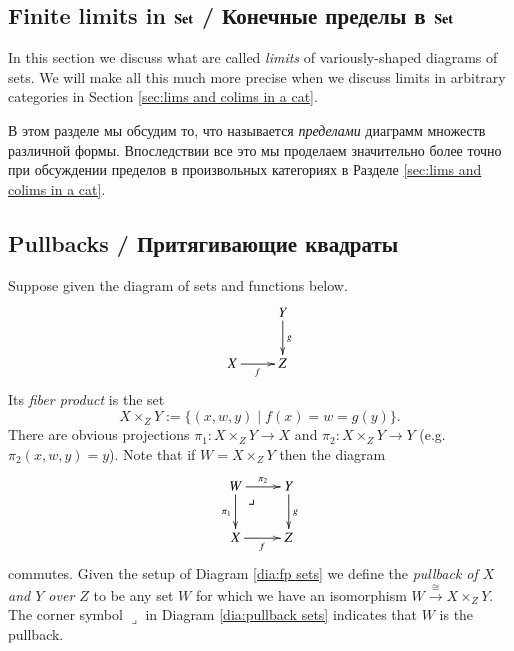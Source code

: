 \documentclass[a4paper]{book}
\makeatletter
\def\to{\rightarrow}
\def\taking{\colon}
\def\iso{\cong}
\def\|{{\;|\;}}
\def\ullimit{\ar@{}[rd]|(.3)*+{\lrcorner}}
\newcommand{\To}[1]{\xrightarrow{#1}}
\def\Set{{\bf Set}}
\theoremstyle{myth}
\newtheorem{definitionENG}[envENG]{\begin{english}Definition\end{english}}
\makeatother
\begin{document}
\begin{english}

\section{Finite limits in $\Set$ / Конечные пределы в $\Set$}\label{sec:finite limits}

In this section we discuss what are called {\em limits} of variously-shaped diagrams of sets. We will make all this much more precise when we discuss limits in arbitrary categories in Section \ref{sec:lims and colims in a cat}.

\begin{russian}В этом разделе мы обсудим то, что называется {\em пределами} диаграмм множеств различной формы. Впоследствии все это мы проделаем значительно более точно при обсуждении пределов в произвольных категориях в Разделе \ref{sec:lims and colims in a cat}. \end{russian}


\subsection{Pullbacks / Притягивающие квадраты}

\begin{definitionENG}[Pullback]\label{def:pullback}
Suppose given the diagram of sets and functions below.
\begin{align}\label{dia:fp sets}
\xymatrix{&Y\ar[d]^g\\
X\ar[r]_f&Z}
\end{align}
Its {\em fiber product} is the set 
$$X\times_ZY:=\{(x,w,y)\|f(x)=w=g(y)\}.$$ There are obvious projections $\pi_1\taking X\times_ZY\to X$ and $\pi_2\taking X\times_ZY\to Y$ (e.g. $\pi_2(x,w,y)=y$). Note that if $W=X\times_ZY$ then the diagram 
\begin{align}\label{dia:pullback sets}
\xymatrix{W\ullimit\ar[r]^-{\pi_2}\ar[d]_{\pi_1}&Y\ar[d]^g\\
X\ar[r]_f&Z}
\end{align}
commutes. Given the setup of Diagram \ref{dia:fp sets} we define the {\em pullback of $X$ and $Y$ over $Z$} to be any set $W$ for which we have an isomorphism $W\To{\iso}X\times_ZY$. The corner symbol $\lrcorner$ in Diagram \ref{dia:pullback sets} indicates that $W$ is the pullback.
\end{definitionENG}


\end{english}
\end{document}
